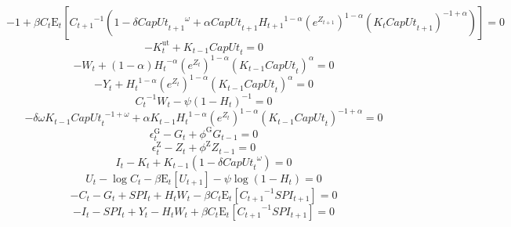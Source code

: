 \begin{equation}
-1 + {\beta} {C_{t}} {\mathrm{E}_{t}\left[{C_{t+1}}^{-1} \left(1 - {\delta} {{{C\!a\!p\!U\!t}_{t+1}}^{\omega}} + {\alpha} {{C\!a\!p\!U\!t}_{t+1}} {{H_{t+1}}^{1 - \alpha}} {\left(e^{Z_{t+1}}\right)^{1 - \alpha}} {\left({K_{t}} {{C\!a\!p\!U\!t}_{t+1}}\right)^{-1 + \alpha}}\right)\right]} = 0
\end{equation}
\begin{equation}
-K^{\mathrm{ut}}_{t} + {K_{t-1}} {{C\!a\!p\!U\!t}_{t}} = 0
\end{equation}
\begin{equation}
-W_{t} + \left(1 - \alpha\right) {{H_{t}}^{-\alpha}} {\left(e^{Z_{t}}\right)^{1 - \alpha}} {\left({K_{t-1}} {{C\!a\!p\!U\!t}_{t}}\right)^{\alpha}} = 0
\end{equation}
\begin{equation}
-Y_{t} + {{H_{t}}^{1 - \alpha}} {\left(e^{Z_{t}}\right)^{1 - \alpha}} {\left({K_{t-1}} {{C\!a\!p\!U\!t}_{t}}\right)^{\alpha}} = 0
\end{equation}
\begin{equation}
{C_{t}}^{-1} {W_{t}} - {\psi} \left(1 - H_{t}\right)^{-1} = 0
\end{equation}
\begin{equation}
-{\delta} {\omega} {K_{t-1}} {{{C\!a\!p\!U\!t}_{t}}^{-1 + \omega}} + {\alpha} {K_{t-1}} {{H_{t}}^{1 - \alpha}} {\left(e^{Z_{t}}\right)^{1 - \alpha}} {\left({K_{t-1}} {{C\!a\!p\!U\!t}_{t}}\right)^{-1 + \alpha}} = 0
\end{equation}
\begin{equation}
\epsilon^{\mathrm{G}}_{t} - G_{t} + {\phi^{\mathrm{G}}} {G_{t-1}} = 0
\end{equation}
\begin{equation}
\epsilon^{\mathrm{Z}}_{t} - Z_{t} + {\phi^{\mathrm{Z}}} {Z_{t-1}} = 0
\end{equation}
\begin{equation}
I_{t} - K_{t} + {K_{t-1}} \left(1 - {\delta} {{{C\!a\!p\!U\!t}_{t}}^{\omega}}\right) = 0
\end{equation}
\begin{equation}
U_{t} - \log{C_{t}} - {\beta} {\mathrm{E}_{t}\left[U_{t+1}\right]} - {\psi} {\log\left(1 - H_{t}\right)} = 0
\end{equation}
\begin{equation}
-C_{t} - G_{t} + {S\!P\!I}_{t} + {H_{t}} {W_{t}} - {\beta} {C_{t}} {\mathrm{E}_{t}\left[{C_{t+1}}^{-1} {{S\!P\!I}_{t+1}}\right]} = 0
\end{equation}
\begin{equation}
-I_{t} - {S\!P\!I}_{t} + Y_{t} - {H_{t}} {W_{t}} + {\beta} {C_{t}} {\mathrm{E}_{t}\left[{C_{t+1}}^{-1} {{S\!P\!I}_{t+1}}\right]} = 0
\end{equation}



